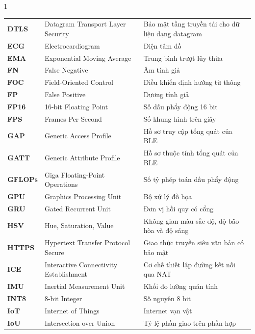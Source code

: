 \begin{spacing}{1}
\begin{longtable}{@{}>{\bfseries\color{HCMUTDarkBlue}}p{2.1cm}p{6.2cm}p{6.5cm}@{}}
  DTLS   & Datagram Transport Layer Security               & Bảo mật tầng truyền tải cho dữ liệu dạng datagram \\
  ECG    & Electrocardiogram                               & Điện tâm đồ \\
  EMA    & Exponential Moving Average                      & Trung bình trượt lũy thừa \\
  FN     & False Negative                                  & Âm tính giả \\
  FOC    & Field-Oriented Control                          & Điều khiển định hướng từ thông \\
  FP     & False Positive                                  & Dương tính giả \\
  FP16   & 16-bit Floating Point                           & Số dấu phẩy động 16 bit \\
  FPS    & Frames Per Second                               & Số khung hình trên giây \\
  GAP    & Generic Access Profile                          & Hồ sơ truy cập tổng quát của BLE \\
  GATT   & Generic Attribute Profile                       & Hồ sơ thuộc tính tổng quát của BLE \\
  GFLOPs & Giga Floating-Point Operations                  & Số tỷ phép toán dấu phẩy động \\
  GPU    & Graphics Processing Unit                        & Bộ xử lý đồ họa \\
  GRU    & Gated Recurrent Unit                            & Đơn vị hồi quy có cổng \\
  HSV    & Hue, Saturation, Value                          & Không gian màu sắc độ, độ bão hòa và độ sáng \\
  HTTPS  & Hypertext Transfer Protocol Secure              & Giao thức truyền siêu văn bản có bảo mật \\
  ICE    & Interactive Connectivity Establishment          & Cơ chế thiết lập đường kết nối qua NAT \\
  IMU    & Inertial Measurement Unit                       & Khối đo lường quán tính \\
  INT8   & 8-bit Integer                                   & Số nguyên 8 bit \\
  IoT    & Internet of Things                              & Internet vạn vật \\
  IoU    & Intersection over Union                         & Tỷ lệ phần giao trên phần hợp \\

\end{longtable}
\end{spacing}
